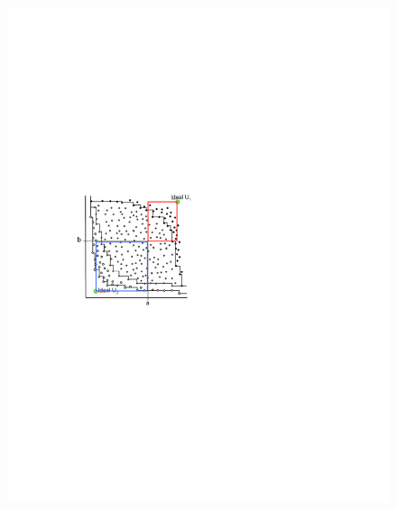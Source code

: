 \begin{figure}[ht]
\begin{minipage}[b]{0.44\hsize}
	\centering
		\includegraphics[width=\hsize]{img/northEast}
\caption{}
\label{fig:northEast}
\end{minipage}
\hspace{0.5cm}
\begin{minipage}[b]{0.5\hsize}
	\centering

\end{minipage}
\end{figure}
